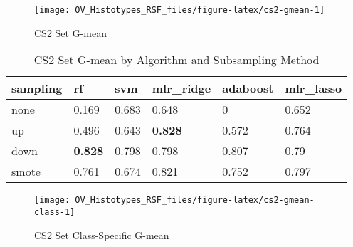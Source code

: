 \documentclass[
]{report}
\begin{document}
\begin{figure}[H]

{\centering \texttt{[image: OV\_Histotypes\_RSF\_files/figure-latex/cs2-gmean-1]} 

}

\caption{CS2 Set G-mean}\label{fig:cs2-gmean}
\end{figure}

\begin{table}

\caption{\label{tab:cs2-gmean-table}CS2 Set G-mean by Algorithm and Subsampling Method}
\centering
\begin{tabular}[t]{l|l|l|l|l|l}
\hline
sampling & rf & svm & mlr\_ridge & adaboost & mlr\_lasso\\
\hline
none & 0.169 & 0.683 & 0.648 & 0 & 0.652\\
\hline
up & 0.496 & 0.643 & \textbf{0.828} & 0.572 & 0.764\\
\hline
down & \textbf{0.828} & 0.798 & 0.798 & 0.807 & 0.79\\
\hline
smote & 0.761 & 0.674 & 0.821 & 0.752 & 0.797\\
\hline
\end{tabular}
\end{table}

\begin{figure}[H]

{\centering \texttt{[image: OV\_Histotypes\_RSF\_files/figure-latex/cs2-gmean-class-1]} 

}

\caption{CS2 Set Class-Specific G-mean}\label{fig:cs2-gmean-class}
\end{figure}
\end{document}
